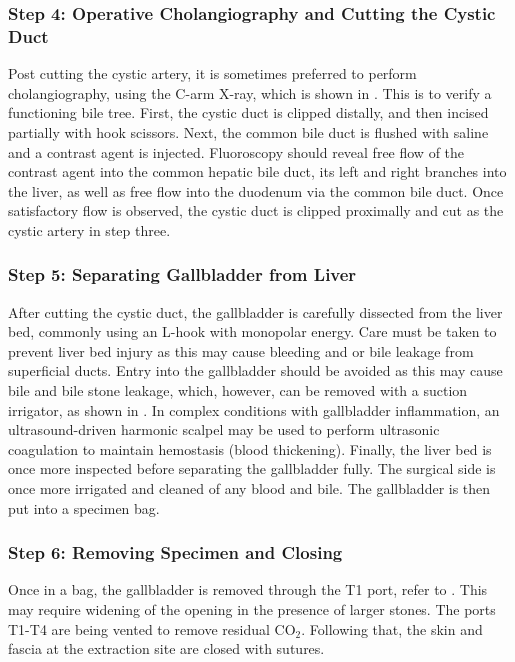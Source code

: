 \subsubsection{Step 4: Operative Cholangiography and Cutting the Cystic Duct} Post cutting the cystic artery, it is sometimes preferred to perform cholangiography, using the C-arm X-ray, which is shown in . This is to verify a functioning bile tree. First, the cystic duct is clipped distally, and then incised partially with hook scissors. Next, the common bile duct is flushed with saline and a contrast agent is injected. Fluoroscopy should reveal free flow of the contrast agent into the common hepatic bile duct, its left and right branches into the liver, as well as free flow into the duodenum via the common bile duct. Once satisfactory flow is observed, the cystic duct is clipped proximally and cut as the cystic artery in step three.


\subsubsection{Step 5: Separating Gallbladder from Liver} After cutting the cystic duct, the gallbladder is carefully dissected from the liver bed, commonly using an L-hook with monopolar energy. Care must be taken to prevent liver bed injury as this may cause bleeding and or bile leakage from superficial ducts. Entry into the gallbladder should be avoided as this may cause bile and bile stone leakage, which, however, can be removed with a suction irrigator, as shown in . In complex conditions with gallbladder inflammation, an ultrasound-driven harmonic scalpel may be used to perform ultrasonic coagulation to maintain hemostasis (blood thickening). Finally, the liver bed is once more inspected before separating the gallbladder fully. The surgical side is once more irrigated and cleaned of any blood and bile. The gallbladder is then put into a specimen bag.

\subsubsection{Step 6: Removing Specimen and Closing} Once in a bag, the gallbladder is removed through the T1 port, refer to . This may require widening of the opening in the presence of larger stones. The ports T1-T4 are being vented to remove residual $\text{CO}_2$. Following that, the skin and fascia at the extraction site are closed with sutures.

